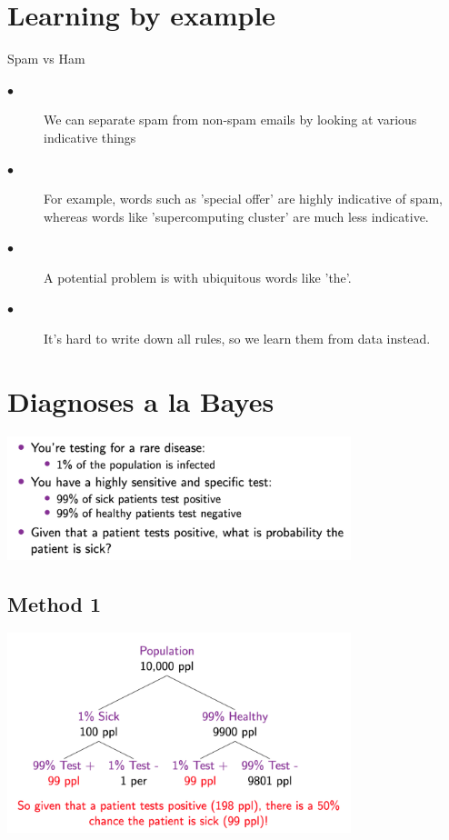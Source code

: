 
\section{Learning by example}
Spam vs Ham
\begin{description}
  \item[$\bullet$] We can separate spam from non-spam emails by looking at various indicative things 
  \item[$\bullet$] For example, words such as 'special offer' are highly indicative of spam, whereas words like 'supercomputing cluster' are much less indicative. 
  \item[$\bullet$] A potential problem is with ubiquitous words like 'the'.
  \item[$\bullet$] It's hard to write down all rules, so we learn them from data instead. 
\end{description}

\section{Diagnoses a la Bayes}
\includegraphics[width=100mm, scale=0.5]{figures/bayes.png}

\subsection{Method 1}
\includegraphics[width=100mm, scale=0.5]{figures/tree.png}

